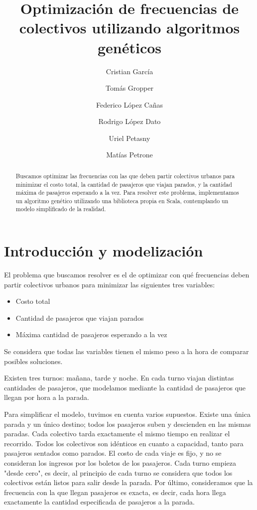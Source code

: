 \documentclass[a4paper,12pt]{article}
\title{Optimización de frecuencias de colectivos utilizando algoritmos genéticos}
\author{Cristian García \and Tomás Gropper \and Federico López Cañas \and Rodrigo López Dato \and Uriel Petasny \and Matías Petrone}
\begin{document}
\maketitle
\begin{abstract}
Buscamos optimizar las frecuencias con las que deben partir colectivos urbanos para minimizar el costo total, la cantidad de pasajeros que viajan parados, y la cantidad máxima de pasajeros esperando a la vez.
Para resolver este problema, implementamos un algoritmo genético utilizando una biblioteca propia en Scala, contemplando un modelo simplificado de la realidad.
\end{abstract}


\section{Introducción y modelización}

El problema que buscamos resolver es el de optimizar con qué frecuencias deben partir colectivos urbanos para minimizar las siguientes tres variables:

\begin{itemize}
	\item Costo total
	\item Cantidad de pasajeros que viajan parados
	\item Máxima cantidad de pasajeros esperando a la vez
\end{itemize}

Se considera que todas las variables tienen el mismo peso a la hora de comparar posibles soluciones.

Existen tres turnos: mañana, tarde y noche.
En cada turno viajan distintas cantidades de pasajeros, que modelamos mediante la cantidad de pasajeros que llegan por hora a la parada.

Para simplificar el modelo, tuvimos en cuenta varios supuestos.
Existe una única parada y un único destino; todos los pasajeros suben y descienden en las mismas paradas.
Cada colectivo tarda exactamente el mismo tiempo en realizar el recorrido.
Todos los colectivos son idénticos en cuanto a capacidad, tanto para pasajeros sentados como parados.
El costo de cada viaje es fijo, y no se consideran los ingresos por los boletos de los pasajeros.
Cada turno empieza "desde cero", es decir, al principio de cada turno se considera que todos los colectivos están listos para salir desde la parada.
Por último, consideramos que la frecuencia con la que llegan pasajeros es exacta, es decir, cada hora llega exactamente la cantidad especificada de pasajeros a la parada.
\end{document}
